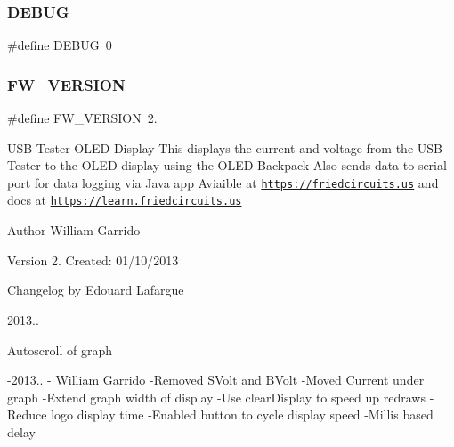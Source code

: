 \subsubsection{\texorpdfstring{D\+E\+B\+UG}{DEBUG}}
{\footnotesize\ttfamily \#define D\+E\+B\+UG~0}

\hypertarget{_u_s_b___tester___o_l_e_d__128x64___beta__2_82_8ino_a80bd8a83eaaf4466b44c61321c39b11b}{}\label{_u_s_b___tester___o_l_e_d__128x64___beta__2_82_8ino_a80bd8a83eaaf4466b44c61321c39b11b} 
\subsubsection{\texorpdfstring{F\+W\+\_\+\+V\+E\+R\+S\+I\+ON}{FW\_VERSION}}
{\footnotesize\ttfamily \#define F\+W\+\_\+\+V\+E\+R\+S\+I\+ON~2.}

U\+SB Tester O\+L\+ED Display This displays the current and voltage from the U\+SB Tester to the O\+L\+ED display using the O\+L\+ED Backpack Also sends data to serial port for data logging via Java app Aviaible at \href{https://friedcircuits.us}{\tt https\+://friedcircuits.\+us} and docs at \href{https://learn.friedcircuits.us}{\tt https\+://learn.\+friedcircuits.\+us}

\begin{DoxyAuthor}{Author}
William Garrido 
\end{DoxyAuthor}
\begin{DoxyVersion}{Version}
2. Created\+: 01/10/2013
\end{DoxyVersion}
Changelog by Edouard Lafargue

2013..
\begin{DoxyItemize}
\item Autoscroll of graph
\end{DoxyItemize}

-\/2013.. -\/ William Garrido -\/\+Removed S\+Volt and B\+Volt -\/\+Moved Current under graph -\/\+Extend graph width of display -\/\+Use clear\+Display to speed up redraws -\/\+Reduce logo display time -\/\+Enabled button to cycle display speed -\/\+Millis based delay

